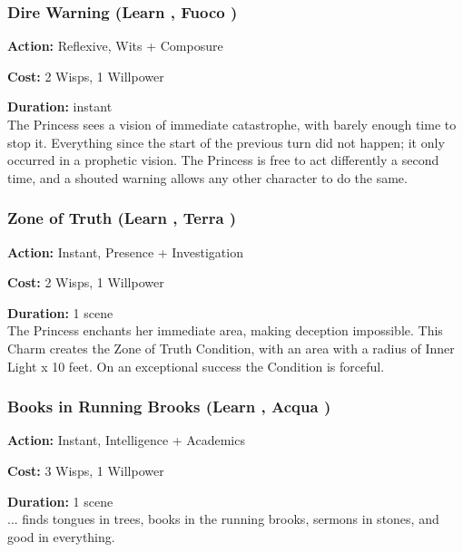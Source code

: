 \subsubsection*{Dire Warning (Learn \textbullet\textbullet\textbullet\textbullet, Fuoco \textbullet\textbullet\textbullet)}

\noindent \textbf{Action:} Reflexive, Wits + Composure

\noindent \textbf{Cost:} 2 Wisps, 1 Willpower

\noindent \textbf{Duration:} instant \\

\noindent The Princess sees a vision of immediate catastrophe, with barely enough time to stop it. Everything since the start of the previous turn did not happen; it only occurred in a prophetic vision. The Princess is free to act differently a second time, and a shouted warning allows any other character to do the same.

\subsubsection*{Zone of Truth (Learn \textbullet\textbullet\textbullet\textbullet, Terra \textbullet\textbullet\textbullet)}

\noindent \textbf{Action:} Instant, Presence + Investigation

\noindent \textbf{Cost:} 2 Wisps, 1 Willpower

\noindent \textbf{Duration:} 1 scene \\

\noindent The Princess enchants her immediate area, making deception impossible. This Charm creates the Zone of Truth Condition, with an area with a radius of Inner Light x 10 feet. On an exceptional success the Condition is forceful. 

\subsubsection*{Books in Running Brooks (Learn \textbullet\textbullet\textbullet\textbullet\textbullet, Acqua \textbullet\textbullet\textbullet\textbullet)}

\noindent \textbf{Action:} Instant, Intelligence + Academics

\noindent \textbf{Cost:} 3 Wisps, 1 Willpower

\noindent \textbf{Duration:} 1 scene \\

\noindent ... finds tongues in trees, books in the running brooks, sermons in stones, and good in everything.

